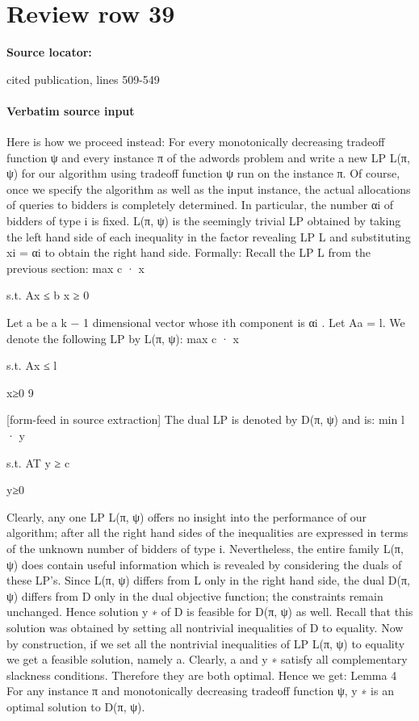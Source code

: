 \documentclass[10pt]{article}
\begin{document}
\section*{Review row 39}
\textbf{Source locator:} {\footnotesize\raggedright cited publication, lines 509-\allowbreak{}549\par}
\paragraph{Verbatim source input}
\begin{ReviewVerbatim}
Here is how we proceed instead: For every monotonically decreasing tradeoff function ψ and
every instance π of the adwords problem and write a new LP L(π, ψ) for our algorithm using
tradeoff function ψ run on the instance π. Of course, once we specify the algorithm as well
as the input instance, the actual allocations of queries to bidders is completely determined.
In particular, the number αi of bidders of type i is fixed. L(π, ψ) is the seemingly trivial
LP obtained by taking the left hand side of each inequality in the factor revealing LP L and
substituting xi = αi to obtain the right hand side. Formally:
Recall the LP L from the previous section:
max c · x

s.t. Ax ≤ b x ≥ 0

Let a be a k − 1 dimensional vector whose ith component is αi . Let Aa = l. We denote the
following LP by L(π, ψ):
max c · x

s.t. Ax ≤ l

x≥0
9


[form-feed in source extraction]
The dual LP is denoted by D(π, ψ) and is:
min l · y

s.t. AT y ≥ c

y≥0

Clearly, any one LP L(π, ψ) offers no insight into the performance of our algorithm; after
all the right hand sides of the inequalities are expressed in terms of the unknown number of
bidders of type i. Nevertheless, the entire family L(π, ψ) does contain useful information which
is revealed by considering the duals of these LP’s.
Since L(π, ψ) differs from L only in the right hand side, the dual D(π, ψ) differs from D only
in the dual objective function; the constraints remain unchanged. Hence solution y ∗ of D is
feasible for D(π, ψ) as well. Recall that this solution was obtained by setting all nontrivial
inequalities of D to equality.
Now by construction, if we set all the nontrivial inequalities of LP L(π, ψ) to equality we get a
feasible solution, namely a. Clearly, a and y ∗ satisfy all complementary slackness conditions.
Therefore they are both optimal. Hence we get:
Lemma 4 For any instance π and monotonically decreasing tradeoff function ψ, y ∗ is an
optimal solution to D(π, ψ).
\end{ReviewVerbatim}
\end{document}
